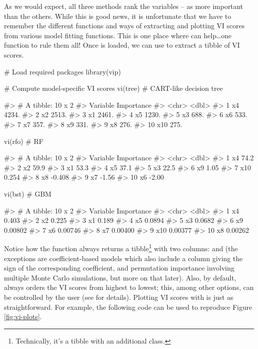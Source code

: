 As we would expect, all three methods rank the variables
-- as more important than the others. While this is
good news, it is unfortunate that we have to remember the different
functions and ways of extracting and plotting VI scores from various
model fitting functions. This is one place where  can
help\ldots{}one function to rule them all! Once  is loaded, we
can use  to extract a tibble of VI scores.

\begin{Schunk}
\begin{Sinput}
# Load required packages
library(vip)

# Compute model-specific VI scores
vi(tree)  # CART-like decision tree
\end{Sinput}
\begin{Soutput}
#> # A tibble: 10 x 2
#>    Variable Importance
#>    <chr>         <dbl>
#>  1 x4            4234.
#>  2 x2            2513.
#>  3 x1            2461.
#>  4 x5            1230.
#>  5 x3             688.
#>  6 x6             533.
#>  7 x7             357.
#>  8 x9             331.
#>  9 x8             276.
#> 10 x10            275.
\end{Soutput}
\begin{Sinput}
vi(rfo)   # RF
\end{Sinput}
\begin{Soutput}
#> # A tibble: 10 x 2
#>    Variable Importance
#>    <chr>         <dbl>
#>  1 x4           74.2
#>  2 x2           59.9
#>  3 x1           53.3
#>  4 x5           37.1
#>  5 x3           22.5
#>  6 x9            1.05
#>  7 x10           0.254
#>  8 x8           -0.408
#>  9 x7           -1.56
#> 10 x6           -2.00
\end{Soutput}
\begin{Sinput}
vi(bst)   # GBM
\end{Sinput}
\begin{Soutput}
#> # A tibble: 10 x 2
#>    Variable Importance
#>    <chr>         <dbl>
#>  1 x4          0.403
#>  2 x2          0.225
#>  3 x1          0.189
#>  4 x5          0.0894
#>  5 x3          0.0682
#>  6 x9          0.00802
#>  7 x6          0.00746
#>  8 x7          0.00400
#>  9 x10         0.00377
#> 10 x8          0.00262
\end{Soutput}
\end{Schunk}

Notice how the  function always returns a
tibble\footnote{Technically, it's a tibble with an additional  class.}
with two columns:  and  (the exceptions
are coefficient-based models which also include a  column
giving the sign of the corresponding coefficient, and permutation
importance involving multiple Monte Carlo simulations, but more on that
later). Also, by default,  always orders the VI scores from
highest to lowest; this, among other options, can be controlled by the
user (see  for details). Plotting VI scores with
 is just as straightforward. For example, the following code
can be used to reproduce Figure \ref{fig:vi-plots}.

